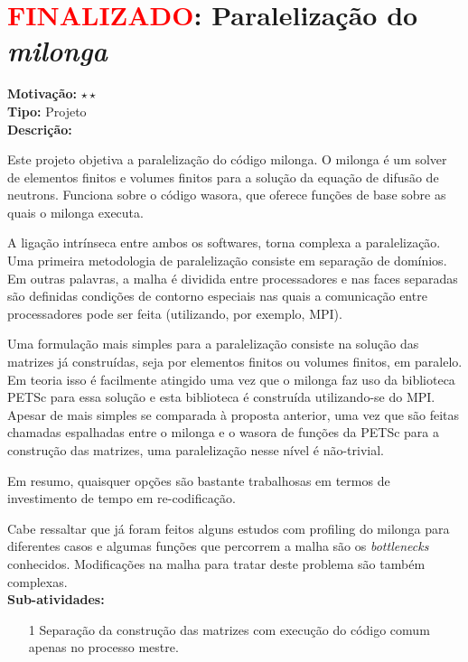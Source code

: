 \chapter{\textcolor{red}{FINALIZADO}: Paralelização do \textit{milonga}}

\textbf{Motivação:} $\star\star$\\

\textbf{Tipo:} Projeto\\

\textbf{Descrição:}

Este projeto objetiva a paralelização do código milonga. O milonga é um solver 
de elementos finitos e volumes finitos para a solução da equação de difusão de 
neutrons. Funciona sobre o código wasora, que oferece funções de base sobre as 
quais o milonga executa.

A ligação intrínseca entre ambos os softwares, torna complexa a paralelização. 
Uma primeira metodologia de paralelização consiste em separação de domínios. 
Em outras palavras, a malha é dividida entre processadores e nas faces separadas 
são definidas condições de contorno especiais nas quais a comunicação entre 
processadores pode ser feita (utilizando, por exemplo, MPI).

Uma formulação mais simples para a paralelização consiste na solução das matrizes 
já construídas, seja por elementos finitos ou volumes finitos, em paralelo. Em 
teoria isso é facilmente atingido uma vez que o milonga faz uso da biblioteca 
PETSc para essa solução e esta biblioteca é construída utilizando-se do MPI. 
Apesar de mais simples se comparada à proposta anterior, uma vez que são feitas 
chamadas espalhadas entre o milonga e o wasora de funções da PETSc para a construção das matrizes, uma paralelização nesse nível é não-trivial.

Em resumo, quaisquer opções são bastante trabalhosas em termos de investimento 
de tempo em re-codificação.

Cabe ressaltar que já foram feitos alguns estudos com profiling do milonga para 
diferentes casos e algumas funções que percorrem a malha são os \textit{bottlenecks} conhecidos. Modificações na malha para tratar deste problema 
são também complexas.\\

\textbf{Sub-atividades:}

\begin{itemize}
	\item[1] Separação da construção das matrizes com execução do código comum 
	apenas no processo mestre.
\end{itemize}

